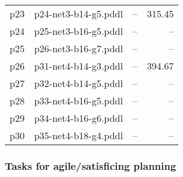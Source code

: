 \documentclass{article}
\begin{document}
\begin{center}
\begin{tabular}{@{}l|r|r|r@{}}
  p23& p24-net3-b14-g5.pddl&--&315.45\\
  p24& p25-net3-b16-g5.pddl&--&--\\
  p25& p26-net3-b16-g7.pddl&--&--\\
  p26& p31-net4-b14-g3.pddl&--&394.67\\
  p27& p32-net4-b14-g5.pddl&--&--\\
  p28& p33-net4-b16-g5.pddl&--&--\\
  p29& p34-net4-b16-g6.pddl&--&--\\
  p30& p35-net4-b18-g4.pddl&--&--
                            \end{tabular}
                            \end{center}
                    

                    \subsubsection*{Tasks for agile/satisficing planning}
                    
\end{document}
